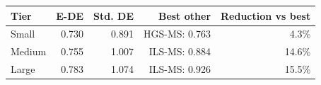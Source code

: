 \begin{tabular}{lrrrr}
\toprule
Tier & E-DE & Std. DE & Best other & Reduction vs best \\
\midrule
Small & 0.730 & 0.891 & HGS-MS: 0.763 & 4.3\% \\
Medium & 0.755 & 1.007 & ILS-MS: 0.884 & 14.6\% \\
Large & 0.783 & 1.074 & ILS-MS: 0.926 & 15.5\% \\
\bottomrule
\end{tabular}
